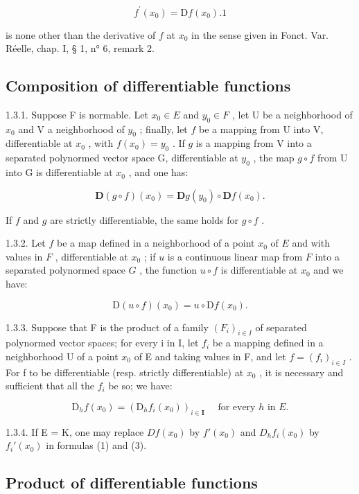 \[
f ^ {\prime} (x _ {0}) = \mathrm{D} f (x _ {0}). 1
\]

is none other than the derivative of \(f\) at \(x_0\) in the sense given in Fonct. Var. Réelle, chap. I, § 1, n° 6, remark 2.

\subsection{Composition of differentiable functions}

1.3.1. Suppose F is normable. Let \(x_0 \in E\) and \(y_0 \in F\) , let U be a neighborhood of \(x_0\) and V a neighborhood of \(y_0\) ; finally, let \(f\) be a mapping from U into V, differentiable at \(x_0\) , with \(f(x_0) = y_0\) . If \(g\) is a mapping from V into a separated polynormed vector space G, differentiable at \(y_0\) , the map \(g \circ f\) from U into G is differentiable at \(x_0\) , and one has:

\[
\mathbf {D} (g \circ f) (x _ {0}) = \mathbf {D} g (y _ {0}) \circ \mathbf {D} f (x _ {0}).\tag{1}
\]

If \(f\) and \(g\) are strictly differentiable, the same holds for \(g \circ f\) .

1.3.2. Let \(f\) be a map defined in a neighborhood of a point \(x_0\) of \(E\) and with values in \(F\) , differentiable at \(x_0\) ; if \(u\) is a continuous linear map from \(F\) into a separated polynormed space \(G\) , the function \(u \circ f\) is differentiable at \(x_0\) and we have:

\[
\mathrm{D} (u \circ f) (x _ {0}) = u \circ \mathrm{D} f (x _ {0}).\tag{2}
\]

1.3.3. Suppose that F is the product of a family \((F_{i})_{i\in I}\) of separated polynormed vector spaces; for every i in I, let \(f_{i}\) be a mapping defined in a neighborhood U of a point \(x_{0}\) of E and taking values in F, and let \(f = (f_{i})_{i\in I}\) . For f to be differentiable (resp. strictly differentiable) at \(x_{0}\) , it is necessary and sufficient that all the \(f_{i}\) be so; we have:

\[
\mathrm{D} _ {h} f (x _ {0}) = (\mathrm{D} _ {h} f _ {i} (x _ {0})) _ {i \in \mathbf {I}} \quad \text { for   every } h \text { in } E.\tag{3}
\]

1.3.4. If E = K, one may replace \(Df(x_{0})\) by \(f'(x_{0})\) and \(D_{h}f_{i}(x_{0})\) by \(f_{i}'(x_{0})\) in formulas (1) and (3).

\subsection{Product of differentiable functions}

